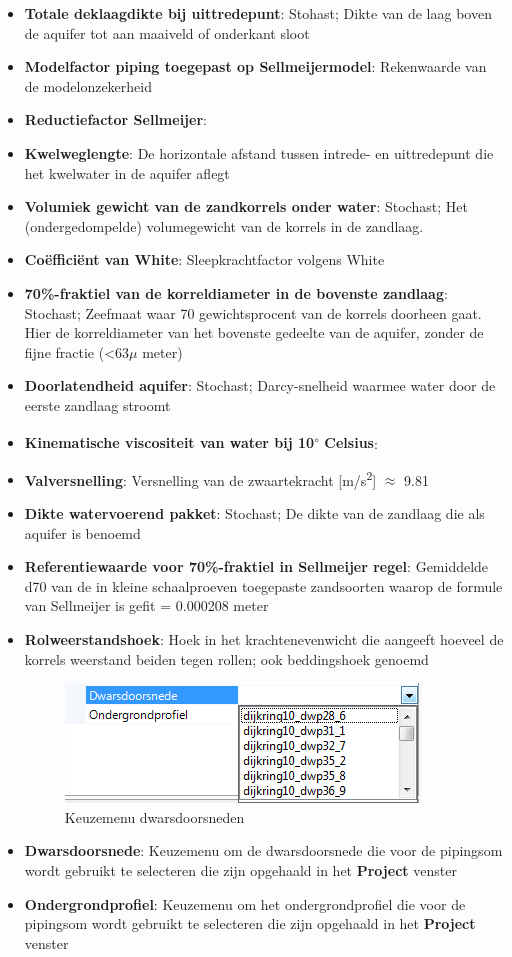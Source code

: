 \begin{enumerate}
\begin{itemize}
	\item \textbf{Totale deklaagdikte bij uittredepunt}: Stohast; Dikte van de laag boven de aquifer tot aan maaiveld of onderkant sloot
	\item \textbf{Modelfactor piping toegepast op Sellmeijermodel}: Rekenwaarde van de modelonzekerheid
	\item \textbf{Reductiefactor Sellmeijer}: 
	\item \textbf{Kwelweglengte}: De horizontale afstand tussen intrede- en uittredepunt die het kwelwater in de aquifer aflegt
	\item \textbf{Volumiek gewicht van de zandkorrels onder water}: Stochast; Het (ondergedompelde) volumegewicht van de korrels in de zandlaag.
	\item \textbf{Co\"{e}ffici\"{e}nt van White}: Sleepkrachtfactor volgens White
	\item \textbf{70\%-fraktiel van de korreldiameter in de bovenste zandlaag}: Stochast; Zeefmaat waar 70 gewichtsprocent van de korrels doorheen gaat. Hier de korreldiameter van het bovenste gedeelte van de aquifer, zonder de fijne fractie (<63$\mu$ meter)
	\item \textbf{Doorlatendheid aquifer}: Stochast; Darcy-snelheid waarmee water door de eerste zandlaag stroomt
	\item \textbf{Kinematische viscositeit van water bij 10\textsuperscript{$\circ$} Celsius}: 
	\item \textbf{Valversnelling}: Versnelling van de zwaartekracht [m/s\textsuperscript{2}] $\approx$ 9.81
	\item \textbf{Dikte watervoerend pakket}: Stochast; De dikte van de zandlaag die als aquifer is benoemd
	\item \textbf{Referentiewaarde voor 70\%-fraktiel in Sellmeijer regel}: Gemiddelde d70 van de in kleine schaalproeven toegepaste zandsoorten waarop de formule van Sellmeijer is gefit = 0.000208 meter
	\item \textbf{Rolweerstandshoek}: Hoek in het krachtenevenwicht die aangeeft hoeveel de korrels weerstand beiden tegen rollen; ook beddingshoek genoemd
	\begin{figure} [H]
	\centering
		\includegraphics{figures/chapter_piping/PipingSurfacelines}
	\caption{Keuzemenu dwarsdoorsneden}
	\label{fig:piping.PipingSurfacelines}
\end{figure}
	\item \textbf{Dwarsdoorsnede}: Keuzemenu om de dwarsdoorsnede die voor de pipingsom wordt gebruikt te selecteren die zijn opgehaald in het \textbf{Project} venster
	\item \textbf{Ondergrondprofiel}: Keuzemenu om het ondergrondprofiel die voor de pipingsom wordt gebruikt te selecteren die zijn opgehaald in het \textbf{Project} venster
	\end{itemize}


\end{enumerate}
